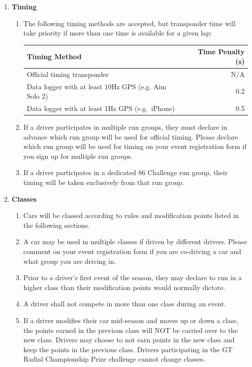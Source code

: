\documentclass{article}
\newenvironment{legallist}{
    \begin{enumerate}[label*=\arabic*.]
}{
    \end{enumerate}
}
\begin{document}
\begin{legallist}
\begin{legallist}
				\item \textbf{Timing}
				\begin{legallist}
					\item The following timing methods are accepted, but transponder time will take priority if more than one time is available for a given lap:
					\begin{longtable}{l r} 
                        \toprule
						\textbf{Timing Method}                               & \textbf{Time Penalty (s)} \\
						\midrule
						Official timing transponder                          & N/A                       \\
						\midrule
						Data logger with at least 10Hz GPS (e.g. Aim Solo 2) & 0.2                       \\
						\midrule
						Data logger with at least 1Hz GPS (e.g.\ iPhone)      & 0.5                       \\
						\bottomrule
					\end{longtable}
										
					\item If a driver participates in multiple run groups, they must declare in advance which run group will be used for official timing. Please declare which run group will be used for timing on your event registration form if you sign up for multiple run groups.
										                
					\item If a driver participates in a dedicated 86 Challenge run group, their timing will be taken exclusively from that run group.
				\end{legallist}
								            
				\item \textbf{Classes}
				\begin{legallist}
					\item Cars will be classed according to rules and modification points listed in the following sections.
					\item A car may be used in multiple classes if driven by different drivers. Please comment on your event registration form if you are co-driving a car and what group you are driving in.
					\item Prior to a driver’s first event of the season, they may declare to run in a higher class than their modification points would normally dictate.
					\item A driver shall not compete in more than one class during an event.
					\item If a driver modifies their car mid-season and moves up or down a class, the points earned in the previous class will NOT be carried over to the new class. Drivers may choose to not earn points in the new class and keep the points in the previous class.  Drivers participating in the GT Radial Championship Prize challenge cannot change classes.
				\end{legallist}
								

\end{legallist}
\end{legallist}
\end{document}
